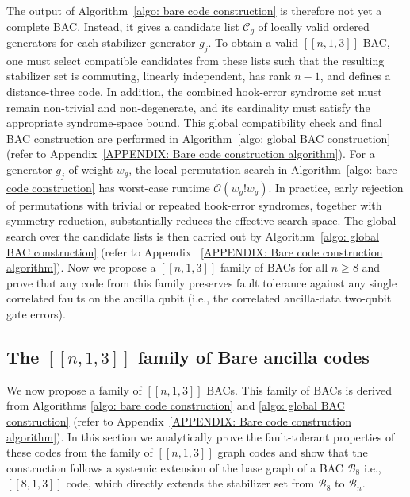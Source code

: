 \documentclass[reprint, amsmath,amssymb, aps,pra,
 floatfix,
]{revtex4-2}
\begin{document}
\noindent The output of Algorithm~\ref{algo: bare code construction} is therefore not yet a complete BAC.
Instead, it gives a candidate list $\mathcal{C}_g$ of locally valid ordered generators for each stabilizer generator $g_j$.
To obtain a valid \([[n,1,3]]\) BAC, one must select compatible candidates from these lists such that the resulting stabilizer set is commuting, linearly independent, has rank $n-1$, and defines a distance-three code.
In addition, the combined hook-error syndrome set must remain non-trivial and non-degenerate, and its cardinality must satisfy the appropriate syndrome-space bound.
This global compatibility check and final BAC construction are performed in Algorithm~\ref{algo: global BAC construction} (refer to Appendix~\ref {APPENDIX: Bare code construction algorithm}).
\noindent For a generator $g_j$ of weight $w_g$, the local permutation search in Algorithm~\ref{algo: bare code construction} has worst-case runtime $\mathcal{O}(w_g!w_g)$.
In practice, early rejection of permutations with trivial or repeated hook-error syndromes, together with symmetry reduction, substantially reduces the effective search space.
The global search over the candidate lists is then carried out by Algorithm~\ref{algo: global BAC construction} (refer to Appendix ~\ref {APPENDIX: Bare code construction algorithm}).
Now we propose a $[[n, 1, 3]]$ family of BACs for all $n\geq8$ and prove that any code from this family preserves fault tolerance against any single correlated faults on the ancilla qubit (i.e., the correlated ancilla-data two-qubit gate errors).
\subsection{The \texorpdfstring{$[[n,1,3]]$}{[[n,1,3]]} family of Bare ancilla codes}
\noindent We now propose a family of $[[n,1,3]]$ BACs.
This family of BACs is derived from Algorithms \ref{algo: bare code construction} and \ref{algo: global BAC construction} (refer to Appendix~\ref {APPENDIX: Bare code construction algorithm}).
In this section we analytically prove the fault-tolerant properties of these codes from the family of $[[n,1,3]]$ graph codes and show that the construction follows a systemic extension of the base graph of a BAC $\mathcal{B}_8$ i.e., $ [[8,1,3]]$ code, which directly extends the stabilizer set from $\mathcal{B}_8$ to $\mathcal{B}_n$.
\end{document}
